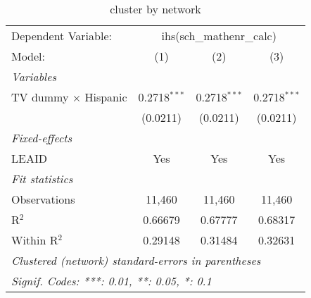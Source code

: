 \begin{table}[htbp]
\centering
\caption{cluster by network}
\begin{tabular}{lccc}
\tabularnewline\midrule\midrule
Dependent Variable:&\multicolumn{3}{c}{ihs(sch\_mathenr\_calc)}\\
Model:&(1) & (2) & (3)\\
\midrule \emph{Variables}&   &   &  \\
TV dummy $\times$ Hispanic & 0.2718$^{***}$ & 0.2718$^{***}$ & 0.2718$^{***}$\\
  &(0.0211) & (0.0211) & (0.0211)\\
\midrule \emph{Fixed-effects}&   &   &  \\
LEAID & Yes & Yes & Yes\\
\midrule \emph{Fit statistics}&  & & \\
Observations & 11,460&11,460&11,460\\
R$^2$ & 0.66679&0.67777&0.68317\\
Within R$^2$ & 0.29148&0.31484&0.32631\\
\midrule\midrule\multicolumn{4}{l}{\emph{Clustered (network) standard-errors in parentheses}}\\
\multicolumn{4}{l}{\emph{Signif. Codes: ***: 0.01, **: 0.05, *: 0.1}}\\
\end{tabular}
\end{table}


